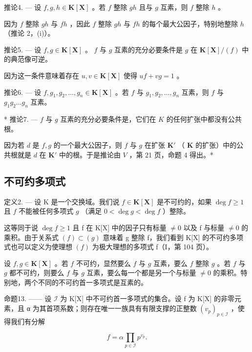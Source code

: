 推论4. --- 设 \(f, g, h \in \mathbf{K}[\mathbf{X}]\) 。若 \(f\) 整除 \(gh\) 且与 \(g\) 互素，则 \(f\) 整除 \(h\) 。

因为 \(f\) 整除 \(gh\) 与 \(fh\) ，因此 \(f\) 整除 \(gh\) 与 \(fh\) 的每个最大公因子，特别地整除 \(h\) （推论 2，(i)）。

推论5. --- 设 \(f, g \in \mathbf{K}[\mathbf{X}]\) 。 \(f\) 与 \(g\) 互素的充分必要条件是 \(g\) 在 \(\mathbf{K}[\mathbf{X}] / (f)\) 中的典范像可逆。

因为这一条件意味着存在 \(u, v \in \mathbf{K}[\mathbf{X}]\) 使得 \(uf + vg = 1\) 。

推论6. --- 设 \(f, g_1, g_2, \ldots, g_n \in \mathbf{K}[\mathbf{X}]\) 。若 \(f\) 与 \(g_1, g_2, \ldots, g_n\) 互素，则 \(f\) 与 \(g_1g_2\ldots g_n\) 互素。

* 推论7. --- \(f\) 与 \(g\) 互素的充分必要条件是，它们在 \(K\) 的任何扩张中都没有公共根。

因为若 \(d\) 是 \(f, g\) 的一个最大公因子，则 \(f\) 与 \(g\) 在扩张 \(\mathbf{K}'\) （ \(\mathbf{K}\) 的扩张）中的公共根就是 \(d\) 在 \(\mathbf{K}'\) 中的根。于是推论由 \(V\) ，第 21 页，命题 4 得出。*

\subsection{不可约多项式}

定义2. --- 设 K 是一个交换域。我们说 \(f \in \mathbf{K}[\mathbf{X}]\) 是不可约的，如果 \(\deg f \geqslant 1\) 且 \(f\) 不能被任何多项式 \(g\) （满足 \(0 < \deg g < \deg f\) ）整除。

这等同于说 \(\deg f \geqslant 1\) 且 f 在 K{[}X{]} 中的因子只有标量 \(\neq 0\) 以及 f 与标量 \(\neq 0\) 的乘积。由于关系式 \((f) \subset (g)\) 意味着 g 整除 f，我们看到 K{[}X{]} 的不可约多项式也可以定义为使理想 \((f)\) 为极大理想的多项式 f（I，第 104 页）。

设 \(f, g \in \mathbf{K}[\mathbf{X}]\) 。若 \(f\) 不可约，显然要么 \(f\) 与 \(g\) 互素，要么 \(f\) 整除 \(g\) 。若 \(f\) 与 \(g\) 都不可约，则要么 \(f\) 与 \(g\) 互素，要么每一个都是另一个与标量 \(\neq 0\) 的乘积。特别地，两个不同的不可约首一多项式是互素的。

命题13. —— 设 \(\mathcal{I}\) 为 K{[}X{]} 中不可约首一多项式的集合。设 f 为 K{[}X{]} 的非零元素，且 α 为其首项系数；则存在唯一一族具有有限支撑的正整数 \((v_{p})_{p\in \mathcal{I}}\) ，使得我们有分解

\[
f = \alpha \prod_ {p \in \mathcal {I}} p ^ {v _ {p}}.\tag{18}
\]

